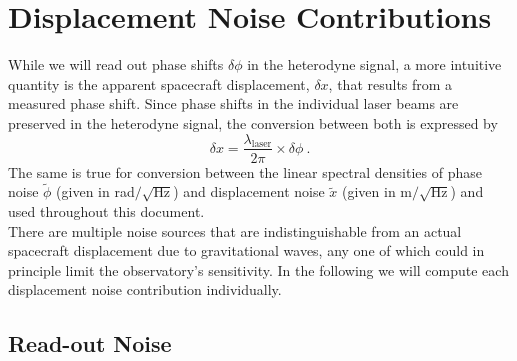 \documentclass[fleqn,10pt]{<approot>/designer/latexelements/SelfArx} %
\begin{document}
\section{Displacement Noise Contributions}

While we will read out phase shifts $\delta \phi$ in the heterodyne signal, a more intuitive quantity is the apparent spacecraft displacement, $\delta x$, that results from a measured phase shift. Since phase shifts in the individual laser beams are preserved in the heterodyne signal, the conversion between both is expressed by
\begin{equation}
\delta x = \frac{\lambda_\text{laser}}{2\pi} \times \delta \phi ~ .
\label{eq:radinpm}
\end{equation}
The same is true for conversion between the linear spectral densities of phase noise $\widetilde{\phi}$ (given in rad$/\sqrt{\text{Hz}}$) and displacement noise $\widetilde{x}$ (given in m$/\sqrt{\text{Hz}}$) and used throughout this document.\\

There are multiple noise sources that are indistinguishable from an actual spacecraft displacement due to gravitational waves, any one of which could in principle limit the observatory's sensitivity. In the following we will compute each displacement noise contribution individually.

\subsection{Read-out Noise}\label{ch:readoutnoise}
\end{document}
